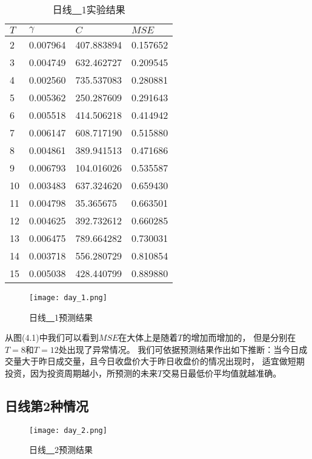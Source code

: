 \begin{table}[ht]
    \centering
    \caption{日线\underline{~~}1实验结果}
    \begin{tabular}{llll}
        \hline
        $T$&  $\gamma$ &         $C$ &     $MSE$ \\
        \hline
         2 &  0.007964 &  407.883894 &  0.157652 \\
         3 &  0.004749 &  632.462727 &  0.209545 \\
         4 &  0.002560 &  735.537083 &  0.280881 \\
         5 &  0.005362 &  250.287609 &  0.291643 \\
         6 &  0.005518 &  414.506218 &  0.414942 \\
         7 &  0.006147 &  608.717190 &  0.515880 \\
         8 &  0.004861 &  389.941513 &  0.471686 \\
         9 &  0.006793 &  104.016026 &  0.535587 \\
        10 &  0.003483 &  637.324620 &  0.659430 \\
        11 &  0.004798 &   35.365675 &  0.663501 \\
        12 &  0.004625 &  392.732612 &  0.660285 \\
        13 &  0.006475 &  789.664282 &  0.730031 \\
        14 &  0.003718 &  556.280729 &  0.810854 \\
        15 &  0.005038 &  428.440799 &  0.889880 \\
        \hline
    \end{tabular}
\end{table}

\begin{figure}[htb]
    \centering
    \caption{日线\underline{~~}1预测结果}
    \texttt{[image: day\_1.png]}
\end{figure}

从图(4.1)中我们可以看到$MSE$在大体上是随着$T$的增加而增加的，
但是分别在$T=8$和$T=12$处出现了异常情况。
我们可依据预测结果作出如下推断：当今日成交量大于昨日成交量，且今日收盘价大于昨日收盘价的情况出现时，
适宜做短期投资，因为投资周期越小，所预测的未来$T$交易日最低价平均值就越准确。

\subsection{日线第2种情况}

\begin{figure}[htb]
    \centering
    \caption{日线\underline{~~}2预测结果}
    \texttt{[image: day\_2.png]}
\end{figure}

